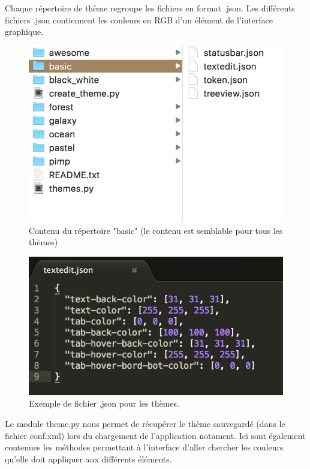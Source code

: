 \documentclass[a4paper,12pt]{article}
\begin{document}
			Chaque répertoire de thème regroupe les fichiers en format .json. Les différents fichiers .json contiennent les couleurs en RGB d'un élément de l'interface graphique.
			
			\begin{figure}[h!]
				\begin{center}
					\includegraphics[scale=0.7]{images/imgs_themes/basic_json}
					\caption{Contenu du répertoire "basic" (le contenu est semblable pour tous les thèmes)}
				\end{center}
			\end{figure}
			\begin{figure}[h!]
				\begin{center}
					\includegraphics[scale=0.7]{images/imgs_themes/exemple_json}
					\caption{Exemple de fichier .json pour les thèmes.}
				\end{center}
			\end{figure}
			
			Le module theme.py nous permet de récupérer le thème sauvegardé (dans le fichier conf.xml) lors du chargement de l'application notament. Ici sont également contenues les méthodes permettant à l'interface d'aller chercher les couleurs qu'elle doit appliquer aux différents éléments.\\
			
\end{document}
